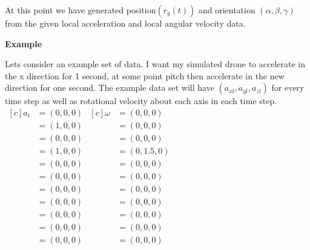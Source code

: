 \documentclass[12pt,letterpaper,boxed]{hmcpset}
\begin{document}
At this point we have generated position$(r_g(t))$ and orientation $(\alpha, \beta, \gamma)$ from the given local acceleration and local angular velocity data.\\

\begin{center}
\textbf{Example}
\end{center}
Lets consider an example set of data. I want my simulated drone to accelerate in the x direction for 1 second, at some point pitch then accelerate in the new direction for one second. The example data set will have $(a_{xl},a_{yl},a_{zl})$ for every time step as well as rotational velocity about each axis in each time step.\\
\begin{math}
\begin{aligned}[c]
a_l &=(0,0,0)\\
&=(1,0,0) \\
&=(0,0,0) \\
&=(1,0,0) \\
&=(0,0,0) \\
&=(0,0,0) \\
&=(0,0,0) \\
&=(0,0,0) \\
&=(0,0,0) \\
&=(0,0,0) \\
&=(0,0,0) 
\end{aligned}
\begin{aligned}[c]
\omega &=(0,0,0) \\
&=(0,0,0) \\
&=(0,0,0) \\
&=(0,1.5,0) \\
&=(0,0,0) \\
&=(0,0,0) \\
&=(0,0,0) \\
&=(0,0,0) \\
&=(0,0,0) \\
&=(0,0,0) \\
&=(0,0,0) 
\end{aligned}
\end{math}
\end{document}
